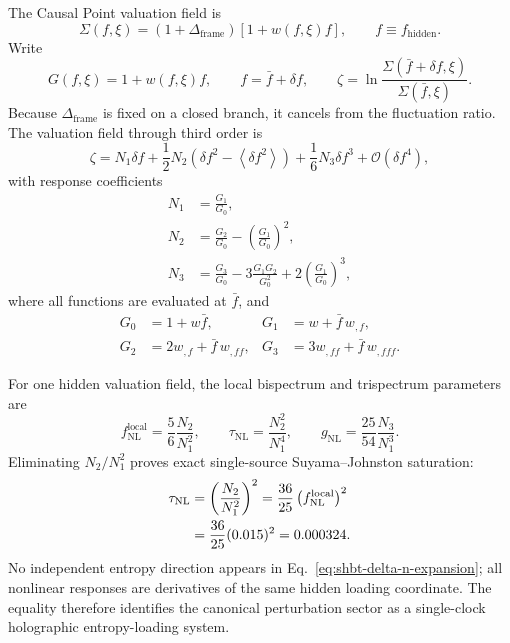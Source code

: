\documentclass[11pt,letterpaper]{article}
\theoremstyle{plain}
\begin{document}
The Causal Point valuation field is
\begin{equation}
\label{eq:shbt-causal-valuation-field}
 \Sigma(f,\xi)
 =
 \left(1+\Delta_{\text{frame}}\right)
 \left[1+w(f,\xi)f\right],
 \qquad
 f\equiv f_{\text{hidden}}.
\end{equation}
Write
\begin{equation}
\label{eq:shbt-valuation-g-function}
 G(f,\xi)
 =
 1+w(f,\xi)f,
 \qquad
 f=\bar f+\delta f,
 \qquad
 \zeta
 =
 \ln\frac{\Sigma(\bar f+\delta f,\xi)}
 {\Sigma(\bar f,\xi)}.
\end{equation}
Because \(\Delta_{\text{frame}}\) is fixed on a closed branch, it cancels from
the fluctuation ratio.  The valuation field through third order is
\begin{equation}
\label{eq:shbt-delta-n-expansion}
 \zeta
 =
 N_1\delta f
 +\frac{1}{2}N_2
 \left(
 \delta f^2-\left\langle\delta f^2\right\rangle
 \right)
 +\frac{1}{6}N_3\delta f^3
 +\mathcal O(\delta f^4),
\end{equation}
with response coefficients
\begin{align}
\label{eq:shbt-valuation-response-coefficients}
 N_1
 &=
 \frac{G_1}{G_0},
 \\
 N_2
 &=
 \frac{G_2}{G_0}
 -\left(\frac{G_1}{G_0}\right)^2,
 \\
 N_3
 &=
 \frac{G_3}{G_0}
 -3\frac{G_1G_2}{G_0^2}
 +2\left(\frac{G_1}{G_0}\right)^3,
\end{align}
where all functions are evaluated at \(\bar f\), and
\begin{align}
\label{eq:shbt-valuation-g-derivatives}
 G_0
 &=
 1+w\bar f,
 &
 G_1
 &=
 w+\bar f\,w_{,f},
 \\
 G_2
 &=
 2w_{,f}+\bar f\,w_{,ff},
 &
 G_3
 &=
 3w_{,ff}+\bar f\,w_{,fff}.
\end{align}

For one hidden valuation field, the local bispectrum and trispectrum
parameters are
\begin{equation}
\label{eq:shbt-delta-n-non-gaussianity}
 f_{\text{NL}}^{\text{local}}
 =
 \frac{5}{6}\frac{N_2}{N_1^2},
 \qquad
 \tau_{\text{NL}}
 =
 \frac{N_2^2}{N_1^4},
 \qquad
 g_{\text{NL}}
 =
 \frac{25}{54}\frac{N_3}{N_1^3}.
\end{equation}
Eliminating \(N_2/N_1^2\) proves exact single-source
Suyama--Johnston saturation:
\begin{align}
\label{eq:shbt-suyama-johnston-proof}
 \tau_{\text{NL}}
 &=
 \left(
 \frac{N_2}{N_1^2}
 \right)^2
 =
 \frac{36}{25}
 \left(
 f_{\text{NL}}^{\text{local}}
 \right)^2
 \notag\\
 &=
 \frac{36}{25}(0.015)^2
 =
 0.000324.
\end{align}
No independent entropy direction appears in
Eq.~\eqref{eq:shbt-delta-n-expansion}; all nonlinear responses are derivatives
of the same hidden loading coordinate.  The equality therefore identifies the
canonical perturbation sector as a single-clock holographic entropy-loading
system.
\end{document}
